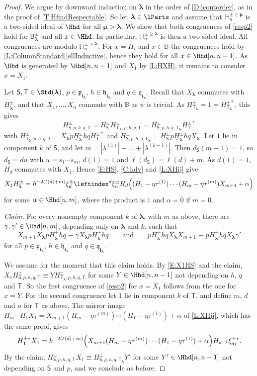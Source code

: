 \documentclass[a4paper,11pt]{amsart}
\newcommand\blam{{\boldsymbol\lambda}}
\newcommand\bmu{{\boldsymbol\mu}}
\newcommand\bi{\mathbf{i}}
\newcommand\ilam[1][\blam]{\bi_{#1}}
\numberwithin{equation}{subsection}
\theoremstyle{definition}
\theoremstyle{theorem}
\theoremstyle{remark}
\newcommand\plam[1][\lambda]{\mathfrak{p}_{#1}}
\newcommand\hlam[1][\lambda]{\mathfrak{h}_{#1}}
\newcommand\qlam[1][\lambda]{\mathfrak{q}_{#1}}
\newcommand\HH{\mathbb{H}}
\newcommand\HJpm{\underline{H}^\pm}
\newcommand\Basis[1][\pm]{\mathsf{B}^{#1}}
\newcommand\xipm{\xi^\pm}
\newcommand\bS{{\mathsf{S}}}
\newcommand\bT{{\mathsf{T}}}
\newcommand\Tlam[1][\blam]{{\mathsf{T}_{#1}}}
\newcommand\taui[1][i]{\tau^{(#1)}}
\newcommand{\Bo}{\mathbb{B}}
\begin{document}
\begin{proof}
  We argue by downward induction on $\blam$ in the order of \autoref{D:lcontorder}, as in the proof of \autoref{T:HfindRespectable}. So let $\blam\in\lParts$ and assume that $\HH^{\pm\ge\bmu}_n$ is a two-sided ideal of $\Hhd$ for all $\bmu>\blam$. We show that both congruences of \autoref{resp2} hold for $\Basis_\blam$ and all $x\in\Hhd$. In particular, $\HH^{\pm\ge\blam}_n$ is then a two-sided ideal. All congruences are modulo $\HH^{\pm>\blam}_n$. For $x=H_i$ and $x\in\Bo$ the congruences hold by \autoref{L:ColumnStandard}\autoref{ellInductive}, hence they hold for all $x\in\Hhd[n,n-1]$. As $\Hhd$ is generated by $\Hhd[n,n-1]$ and $X_1$ by \autoref{L:HXH}, it remains to consider $x=X_1$.

  Let $\bS,\bT\in\Std(\blam)$, $p\in\plam[\ilam]$, $h\in\hlam[\ilam]$ and $q\in\qlam[\ilam]$. Recall that $X_\blam$ commutes with $\HJpm_\blam$, and that $X_1,\dots,X_n$ commute with $\Bo$ as $\psi$ is trivial. As $H^\pm_{\Tlam}=1=H^{\pm*}_{\Tlam}$, this gives
  \[
    H^\pm_{\bS,p,h,q,\bT}=H^\pm_\bS H^\pm_{\Tlam,p,h,q,\bT}=H^\pm_{\bS,p,h,q,\Tlam}H^{\pm*}_\bT
  \]
  with $H^\pm_{\Tlam,p,h,q,\bT}=X_\blam p\HJpm_\blam hqH^{\pm*}_\bT$ and $H^\pm_{\bS,p,h,q,\Tlam}=H^\pm_\bS p\HJpm_\blam hqX_\blam$.
  Let $1$ lie in component $k$ of $\bS$, and let $m=|\lambda^{(1)}|+\dots+|\lambda^{(k-1)}|$. Then $d_\bS(m+1)=1$, so $d_\bS=du$ with $u=s_1\cdots s_m$, $d(1)=1$ and $\ell(d_\bS)=\ell(d)+m$. As $d(1)=1$, $H_d$ commutes with $X_1$. Hence \autoref{E:HS}, \autoref{C:hdv} and \autoref{L:XHij} give
  \begin{equation}\label{E:X1HS}
    X_1H^\pm_\bS=\hbar^{-2(\ell(d)+m)}\xipm_d\leftindex^d{{\xipm_u}}H_d\Bigl((H_1-\eta\taui[1])\cdots(H_m-\eta\taui[m])X_{m+1}+\alpha\Bigr)
  \end{equation}
  for some $\alpha\in\Hhd[n,m]$, where the product is $1$ and $\alpha=0$ if $m=0$.

  \emph{Claim.} For every nonempty component $k$ of $\blam$, with $m$ as above, there are $\gamma,\gamma'\in\Hhd[n,m]$, depending only on $\blam$ and $k$, such that
  \[
    X_{m+1}X_\blam p\HJpm_\blam hq\equiv\gamma X_\blam p\HJpm_\blam hq
    \qquad\text{and}\qquad
    p\HJpm_\blam hqX_\blam X_{m+1}\equiv p\HJpm_\blam hqX_\blam\gamma'
  \]
  for all $p\in\plam[\ilam]$, $h\in\hlam[\ilam]$ and $q\in\qlam[\ilam]$.

We assume for the moment that this claim holds. By \autoref{E:X1HS} and the claim, $X_1H^\pm_{\bS,p,h,q,\bT}\equiv YH^\pm_{\Tlam,p,h,q,\bT}$ for some $Y\in\Hhd[n,n-1]$ not depending on $h$, $q$ and $\bT$. So the first congruence of \autoref{resp2} for $x=X_1$ follows from the one for $x=Y$. For the second congruence let $1$ lie in component $k$ of $\bT$, and define $m$, $d$ and $u$ for $\bT$ as above. The mirror image $H_m\cdots H_1X_1=X_{m+1}(H_m-\eta\taui[m])\cdots(H_1-\eta\taui[1])+\alpha$ of \autoref{L:XHij}, which has the same proof, gives
  \[
    H^{\pm*}_\bT X_1=\hbar^{-2(\ell(d)+m)}\Bigl(X_{m+1}(H_m-\eta\taui[m])\cdots(H_1-\eta\taui[1])+\alpha\Bigr)H_{d^{-1}}\xi^{\pm*}_{d_\bT}.
  \]
  By the claim, $H^\pm_{\bS,p,h,q,\bT}X_1\equiv H^\pm_{\bS,p,h,q,\Tlam}Y'$ for some $Y'\in\Hhd[n,n-1]$ not depending on $\bS$ and $p$, and we conclude as before.


\end{proof}
\end{document}
